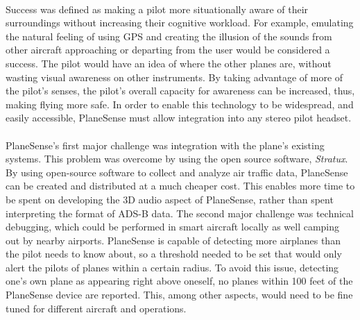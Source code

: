 \paragraph{}
Success was defined as making a pilot more situationally aware of their surroundings without increasing their cognitive workload.  For example, emulating the natural feeling of using GPS and creating the illusion of the sounds from other aircraft approaching or departing from the user would be considered a success.  The pilot would have an idea of where the other planes are, without wasting visual awareness on other instruments. By taking advantage of more of the pilot's senses, the pilot's overall capacity for awareness can be increased, thus, making flying more safe. In order to enable this technology to be widespread, and easily accessible, PlaneSense must allow integration into any stereo pilot headset. 


\paragraph{} 
PlaneSense's first major challenge was integration with the plane's existing systems. This problem was overcome by using the open source software, \textit{Stratux}.
By using open-source software to collect and analyze air traffic data, PlaneSense can be created and distributed at a much cheaper cost.
This enables more time to be spent on developing the 3D audio aspect of PlaneSense, rather than spent interpreting the format of ADS-B data.
The second major challenge was technical debugging, which could be performed in smart aircraft locally as well camping out by nearby airports.  PlaneSense is capable of detecting more airplanes than the pilot needs to know about, so a threshold needed to be set that would only alert the pilots of planes within a certain radius.  To avoid this issue, detecting one's own plane as appearing right above oneself, no planes within 100 feet of the PlaneSense device are reported.  This, among other aspects, would need to be fine tuned for different aircraft and operations. 




